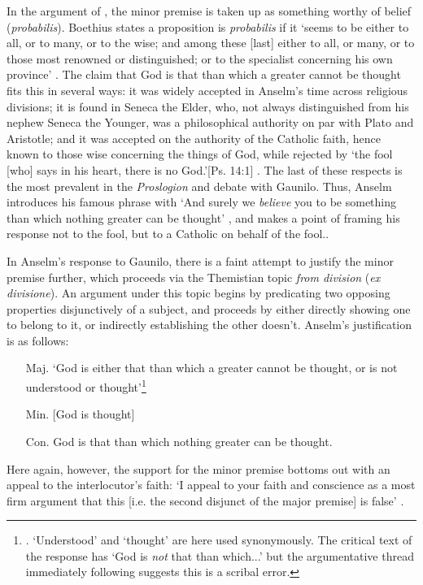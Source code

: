\documentclass[]{amsart}
\begin{document}
In the argument of \cite[Pros. 2]{AnselmPros}, the minor premise is taken up as something worthy of belief (\textit{probabilis}). Boethius states a proposition is \textit{probabilis} if it `seems to be either to all, or to many, or to the wise; and among these [last] either to all, or many, or to those most renowned or distinguished; or to the specialist concerning his own province' \cite[BDT 1180CD]{BDT}. The claim that God is that than which a greater cannot be thought fits this in several ways: it was widely accepted in Anselm's time across religious divisions; it is found in Seneca the Elder, who, not always distinguished from his nephew Seneca the Younger, was a philosophical authority on par with Plato and Aristotle; and it was accepted on the authority of the Catholic faith, hence known to those wise concerning the things of God, while rejected by `the fool [who] says in his heart, there is no God.'[Ps. 14:1] \cite[Pros. 2, 4]{AnselmPros}. The last of these respects is the most prevalent in the \textit{Proslogion} and debate with Gaunilo. Thus, Anselm introduces his famous phrase with `And surely we \textit{believe} you to be something than which nothing greater can be thought' \cite[Pros. 2]{AnselmPros}, and makes a point of framing his response not to the fool, but to a Catholic on behalf of the fool.\cite[Resp. proem.]{AnselmResp}. 

In Anselm's response to Gaunilo, there is a faint attempt to justify the minor premise further, which proceeds via the Themistian topic \textit{from division} (\textit{ex divisione}). An argument under this topic begins by predicating two opposing properties disjunctively of a subject, and proceeds by either directly showing one to belong to it, or indirectly establishing the other doesn't. Anselm's justification is as follows:

\begin{enumerate}
\item[Maj.] `God is either that than which a greater cannot be thought, or is not understood or thought'\footnote{\cite[Resp. 1]{AnselmResp}. `Understood' and `thought' are here used synonymously. The critical text of the response has `God is \textit{not} that than which...' but the argumentative thread immediately following suggests this is a scribal error.}
\item[Min.] [God is thought]
\item[Con.] God is that than which nothing greater can be thought.
\end{enumerate}
Here again, however, the support for the minor premise bottoms out with an appeal to the interlocutor's faith: `I appeal to your faith and conscience as a most firm argument that this [i.e. the second disjunct of the major premise] is false' \cite[Resp. 1]{AnselmResp}.
\end{document}
